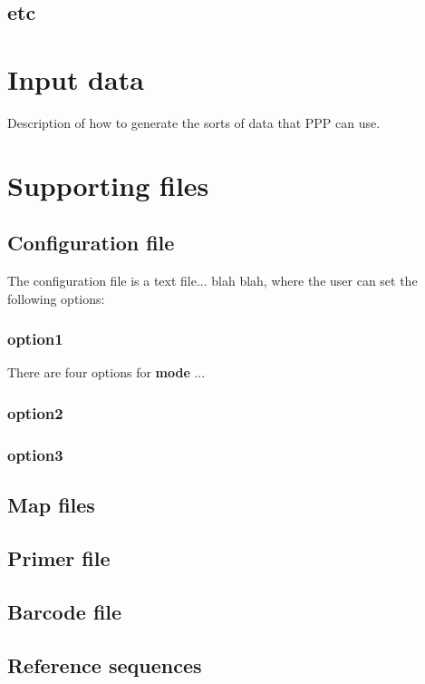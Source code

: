 \documentclass[12pt,letterpaper]{article}
\begin{document}
\subsection{etc}

\bigskip\section{Input data}
Description of how to generate the sorts of data that PPP can use.

\bigskip\section{Supporting files}
\subsection{Configuration file}
The configuration file is a text file... blah blah, where the user can
set the following options:

\subsubsection{option1} %
There are four options for \textbf{mode} ... 

\subsubsection{option2}

\subsubsection{option3}

\subsection{Map files}

\subsection{Primer file}

\subsection{Barcode file}

\subsection{Reference sequences}
\end{document}
